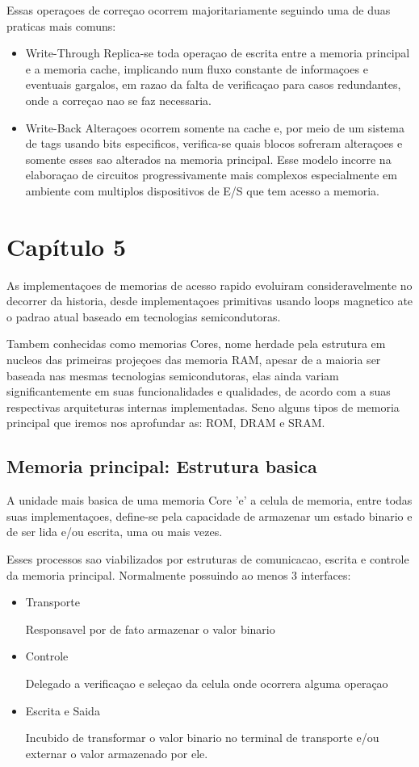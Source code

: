 \documentclass[12pt]{article}
\begin{document}
Essas operaçoes de correçao ocorrem majoritariamente seguindo uma de duas praticas mais comuns:
\begin{itemize}
\item Write-Through
Replica-se toda operaçao de escrita entre a memoria principal e a memoria cache, implicando num fluxo constante de informaçoes e eventuais gargalos, em razao da falta de verificaçao para casos redundantes, onde a correçao nao se faz necessaria.

\item Write-Back
Alteraçoes ocorrem somente na cache e, por meio de um sistema de tags usando bits especificos, verifica-se quais blocos sofreram alteraçoes e somente esses sao alterados na memoria principal. Esse modelo incorre na elaboraçao de circuitos progressivamente mais complexos especialmente em ambiente com multiplos dispositivos de E/S que tem acesso a memoria.
\end{itemize}

\section{Capítulo 5}
As implementaçoes de memorias de acesso rapido evoluiram consideravelmente no decorrer da historia, desde implementaçoes primitivas usando loops magnetico ate o padrao atual baseado em tecnologias semicondutoras. 

Tambem conhecidas como memorias Cores, nome herdade pela estrutura em nucleos das primeiras projeçoes das memoria RAM, apesar de a maioria ser baseada nas mesmas tecnologias semicondutoras, elas ainda variam significantemente em suas funcionalidades e qualidades, de acordo com a suas respectivas arquiteturas internas implementadas. Seno alguns tipos de memoria principal que iremos nos aprofundar as: ROM, DRAM e SRAM.

\subsection{Memoria principal: Estrutura basica}
A unidade mais basica de uma memoria Core 'e' a celula de memoria, entre todas suas implementaçoes, define-se pela capacidade de armazenar um estado binario e de ser lida e/ou escrita, uma ou mais vezes.

Esses processos sao viabilizados por estruturas de comunicacao, escrita e controle da memoria principal. Normalmente possuindo ao menos 3 interfaces:

\begin{itemize}
 \item Transporte

 Responsavel por de fato armazenar o valor binario
\item Controle

Delegado a verificaçao e seleçao da celula onde ocorrera alguma operaçao
\item Escrita e Saida

Incubido de transformar o valor binario no terminal de transporte e/ou externar o valor armazenado por ele.
\end{itemize} 
\end{document}
